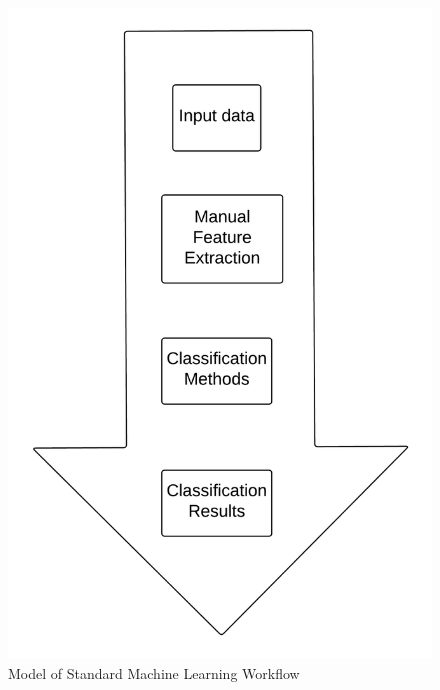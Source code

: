 \documentclass{sig-alternate}
\begin{document}


\begin{figure}[H]
	\begin{center}
		\includegraphics[width=0.75\linewidth]{mlworkflow}
	\end{center}
	\vspace{-12pt}
	\caption{Model of Standard Machine Learning Workflow}
	\label{fig:mlworkflow}
\end{figure}
\end{document}
